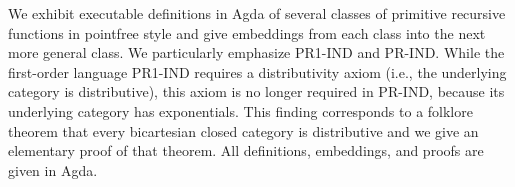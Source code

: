 \documentclass[a4paper,USenglish,cleveref, autoref, thm-restate]{lipics-v2021}
\begin{document}
We exhibit executable definitions in Agda of several classes of primitive
recursive functions in pointfree style and give embeddings from each
class into the next more general class. We particularly emphasize
PR1-IND and PR-IND.
While the first-order language PR1-IND requires a distributivity axiom
(i.e., the underlying category is distributive), this axiom is no
longer required in PR-IND, because its underlying category has
exponentials.
This finding corresponds to a folklore theorem that every bicartesian
closed category is distributive and we give an elementary proof of
that theorem.
All definitions, embeddings, and proofs are given in Agda.





\end{document}
